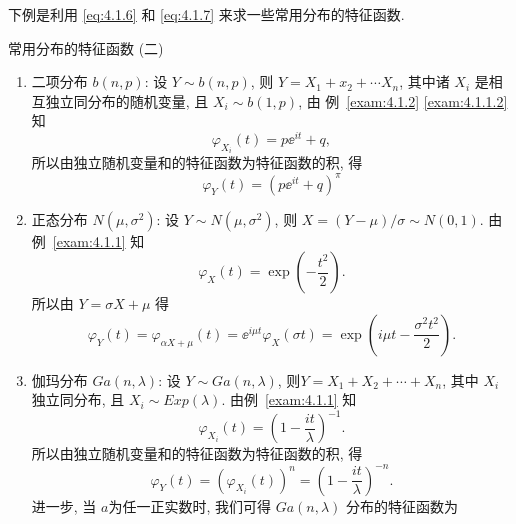 下例是利用 \eqref{eq:4.1.6} 和 \eqref{eq:4.1.7} 来求一些常用分布的特征函数.


\begin{example}\label{exam:4.1.2}
    常用分布的特征函数 (二)

    \begin{enumerate}
        \item
        {\heiti 二项分布} $ b (n, p) $: 设 $ Y \sim b (n, p) $, 则 $ Y = X_1 + x_2 + \dotsb X_n $, 其中诸 $ X_i $ 是相互独立同分布的随机变量, 且 $ X_{i} \sim b (1, p) $, 由 例~\ref{exam:4.1.2} \ref{exam:4.1.1.2} 知
        \begin{equation*}
            \varphi_{X_i} (t) = p \ee^{it} + q,
        \end{equation*}
        所以由独立随机变量和的特征函数为特征函数的积, 得
        \begin{equation*}
            \varphi_Y (t) = \left( p \ee^{it} + q \right)^{\pi}
        \end{equation*}
        \item
        {\heiti 正态分布} $ N (\mu, \sigma^2) $: 设 $ Y \sim N (\mu, \sigma^2) $, 则 $ X = (Y - \mu) / \sigma \sim N (0, 1) $.
        由例~\ref{exam:4.1.1} 知
        \begin{equation*}
            \varphi_{X} (t) = \exp \left( -\frac{t^2}{2} \right).
        \end{equation*}
        所以由 $ Y = \sigma X + \mu $ 得
        \begin{equation*}
            \varphi_Y (t) = \varphi_{\alpha X + \mu} (t) =\ee^{i \mu t} \varphi_X ( \sigma t ) = \exp \left( i \mu t - \frac{\sigma^2 t^2}{2} \right).
        \end{equation*}
        \item
        {\heiti 伽玛分布} $ Ga ( n, \lambda ) $: 设 $ Y \sim Ga ( n, \lambda ) $, 则$ Y = X_1 + X_2 + \dotsb + X_n $, 其中 $ X_i $ 独立同分布, 且 $ X_i \sim Exp ( \lambda ) $.
        由例~\ref{exam:4.1.1} 知
        \begin{equation*}
            \varphi_{X_i} (t) = \left( 1 - \frac{it}{\lambda} \right)^{-1}.
        \end{equation*}
        所以由独立随机变量和的特征函数为特征函数的积, 得
        \begin{equation*}
            \varphi_Y (t) = \left( \varphi_{X_i} (t) \right)^n = \left( 1 - \frac{it}{\lambda} \right)^{-n}.
        \end{equation*}
        进一步, 当 $ a $为任一正实数时, 我们可得 $ Ga ( n, \lambda ) $ 分布的特征函数为

\end{enumerate}
\end{example}
